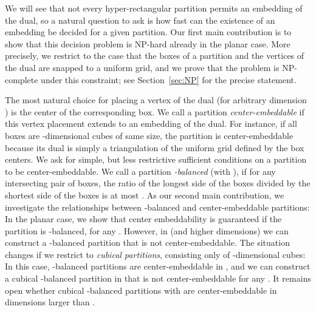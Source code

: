 \documentclass[12pt]{article}
\begin{document}
We will see that not every hyper-rectangular partition permits an embedding of the dual,
so a natural question to ask is how fast can the existence of an embedding 
be decided for a given partition.
Our first main contribution is to show that this decision problem 
is NP-hard already in the planar case. More precisely, we restrict to the case that
the boxes of a partition and the vertices of the dual
are snapped to a uniform grid, and we prove that the problem
is NP-complete under this constraint; 
see Section~\ref{sec:NP} for the precise statement.

The most natural choice for placing a vertex of the dual (for arbitrary dimension )
is the center of the corresponding box. 
We call a partition \emph{center-embeddable} if this vertex placement extends
to an embedding of the dual.
For instance, if all boxes are -dimensional cubes of same size,
the partition is center-embeddable because its dual is simply a triangulation
of the uniform grid defined by the box centers.
We ask for simple, but less restrictive 
sufficient conditions on a partition to be center-embeddable.
We call a partition \emph{-balanced} (with ), if for any intersecting pair of
boxes, the ratio of the longest side of the boxes
divided by the shortest side of the boxes is at most .
As our second main contribution, we investigate the relationships between -balanced
and center-embeddable partitions:
In the planar case, we show that center embeddability is guaranteed 
if the partition is -balanced, for any . However, in  (and higher dimensions)
we can construct a -balanced partition that is not center-embeddable. 
The situation changes if we restrict to \emph{cubical partitions}, consisting
only of -dimensional cubes: In this case, -balanced partitions are center-embeddable
in , and we can construct a cubical -balanced partition in  
that is not center-embeddable for any . 
It remains open whether cubical -balanced partitions with 
are center-embeddable in dimensions larger than .
\end{document}

